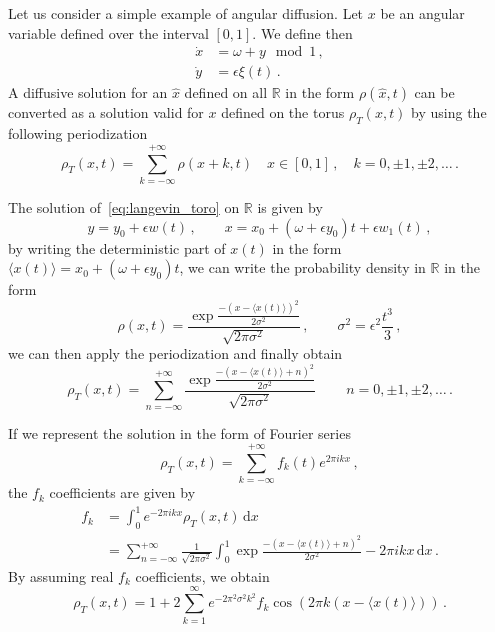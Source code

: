 Let us consider a simple example of angular diffusion. Let \(x\) be an angular variable defined over the interval \([0,1]\). We define then
\begin{equation}
	\begin{aligned}
		\dot{x} &= \omega + y \mod{1}\,, \\
		\dot{y} &= \epsilon\xi(t)	\,.
	\end{aligned}
	\label{eq:langevin_toro}
\end{equation}
A diffusive solution for an \(\hat{x}\) defined on all \(\mathbb{R}\) in the form \(\rho(\hat{x},t)\) can be converted as a solution valid for \(x\) defined on the torus \(\rho_T(x,t)\) by using the following periodization
\begin{equation}
	\rho_T(x,t) = \sum_{k=-\infty}^{+\infty} \rho(x+k,t) \quad x\in[0,1]\,,\quad k = 0,\pm 1, \pm 2, \ldots \,.
\end{equation}

The solution of~\eqref{eq:langevin_toro} on \(\mathbb{R}\) is given by
\begin{equation}
	y = y_0 + \epsilon w(t)\,, \qquad x = x_0 + (\omega + \epsilon y_0) t + \epsilon w_1(t) \,,
\end{equation}
by writing the deterministic part of \(x(t)\) in the form \(\langle x(t) \rangle = x_0 + (\omega + \epsilon y_0) t\), we can write the probability density in \(\mathbb{R}\) in the form
\begin{equation}
	\rho(x,t) = \frac{\exp{\frac{-(x-\langle x(t)\rangle)^2}{2\sigma^2}}}{\sqrt{2\pi\sigma^2}}\,, \qquad \sigma^2 = \epsilon^2 \frac{t^3}{3}\,,
\end{equation}
we can then apply the periodization and finally obtain
\begin{equation}
	\rho_T(x,t) = \sum_{n=-\infty}^{+\infty} \frac{\exp{\frac{-(x-\langle x(t)\rangle + n)^2}{2\sigma^2}}}{\sqrt{2\pi\sigma^2}} \,\qquad n = 0,\pm 1, \pm 2, \ldots\,.
\end{equation}

If we represent the solution in the form of Fourier series
\begin{equation}
	\rho_T(x,t) = \sum_{k=-\infty}^{+\infty} f_k(t)e^{2\pi i k x} \,,
\end{equation}
the \(f_k\) coefficients are given by
\begin{align}
	f_k &= \int_0^1 e^{-2\pi i k x} \rho_T(x,t)\,\mathrm{d}x \\
	&= \sum_{n=-\infty}^{+\infty} \frac{1}{\sqrt{2\pi\sigma^2}} \int_0^1 \exp{\frac{-(x-\langle x(t) \rangle + n)^2}{2\sigma^2} -2\pi i k x}\,\mathrm{d}x \,.
\end{align}
By assuming real \(f_k\) coefficients, we obtain
\begin{equation}
	\rho_T(x,t) = 1+2\sum_{k=1}^\infty e^{-2\pi^2\sigma^2k^2} f_k \cos(2\pi k (x-\langle x(t) \rangle)) \,.
\end{equation}

